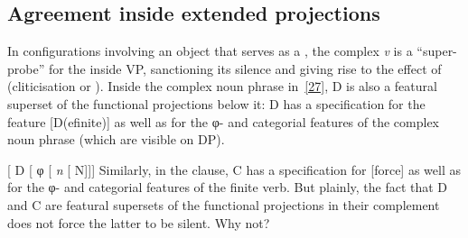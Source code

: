 \documentclass[output=paper]{langsci/langscibook}
\begin{document}
\begin{refcontext}
\section{Agreement inside extended projections}
\label{sec:16.6}

In configurations involving an object that serves as a , the
complex \emph{v} is a \enquote{super-probe} for the  inside VP,
sanctioning its silence and giving rise to the effect of 
(cliticisation or ). Inside the complex noun phrase
in~\eqref{27}, D is also a featural superset of the functional projections below
it: D has a specification for the feature [D(efinite)] as well as for the
φ{}- and categorial features of the complex noun phrase (which are
visible on DP).

\ea  {}[ D [ φ{}
[ \emph{n}\tss{\{[+N]\}} [ N]]]\label{27}
\z
Similarly, in the clause, C has a specification for [force] as well as for the
φ{}- and categorial features of the finite verb. But plainly, the fact
that D and C are featural supersets of the functional projections in their
complement does not force the latter to be silent. Why not?\largerpage[-4]


\end{refcontext}
\end{document}
